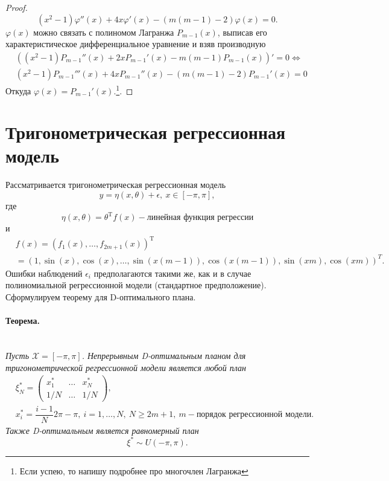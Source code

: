 \documentclass[12pt, a4paper]{article}
\newenvironment{theorem}{\paragraph{Теорема.}\hfill\\\itshape}{\par}
\begin{document}
\begin{proof}
		\begin{equation*}
			(x^2-1)\varphi''(x)+4x\varphi'(x)-(m(m-1)-2)\varphi(x)=0.
		\end{equation*}
		$\varphi(x)$ можно связать с полиномом Лагранжа $P_{m-1}(x)$, выписав его характеристическое дифференциальное уравнение и взяв производную
		\begin{align*}
			&((x^2-1)P_{m-1}''(x)+2xP_{m-1}'(x)-m(m-1)P_{m-1}(x))'=0\Leftrightarrow\\
			&(x^2-1)P_{m-1}'''(x)+4xP_{m-1}''(x)-(m(m-1)-2)P_{m-1}'(x)=0
		\end{align*}
		Откуда $\varphi(x)=P_{m-1}'(x)$.\footnote{Если успею, то напишу подробнее про многочлен Лагранжа}.
	\end{proof}
	\section{Тригонометрическая регрессионная модель}
	Рассматривается тригонометрическая регрессионная модель
	\begin{equation*}
		y=\eta(x,\theta) + \epsilon,~x\in[-\pi, \pi],
	\end{equation*}
	где
	\begin{equation*}
		\eta(x, \theta) = \theta^\mathrm{T}f(x) - \text{линейная функция регрессии}
	\end{equation*}
	и
	\begin{align*}
		&f(x)=( f_1(x),\dots, f_{2m+1}(x))^\mathrm{T}\\
		&=(1,\sin(x), \cos(x),\dots,\sin(x(m-1)), \cos(x(m-1)), \sin(xm), \cos(xm))^T.
	\end{align*}
	Ошибки наблюдений $\epsilon_i$ предполагаются такими же, как и в случае полиномиальной регрессионной модели (стандартное предположение). Сформулируем теорему для D-оптимального плана.
	\begin{theorem}
		Пусть $\mathcal{X}=[-\pi, \pi]$. Непрерывным D-оптимальным планом для тригонометрической регрессионной модели является любой план
		\begin{align*}
			&\xi_N^*=
			\begin{pmatrix}
				x_1^*&\dots&x_N^*\\
				1/N&\dots&1/N
			\end{pmatrix},
			\\
			&x_i^*=\dfrac{i-1}{N}2\pi-\pi,~i=1,\dots,N,~N\geqslant2m+1,~m - \text{порядок регрессионной модели.}
		\end{align*}
		Также D-оптимальным является равномерный план
		\begin{equation*}
			\xi^*\sim U(-\pi, \pi).
		\end{equation*}
	\end{theorem}
\end{document}
